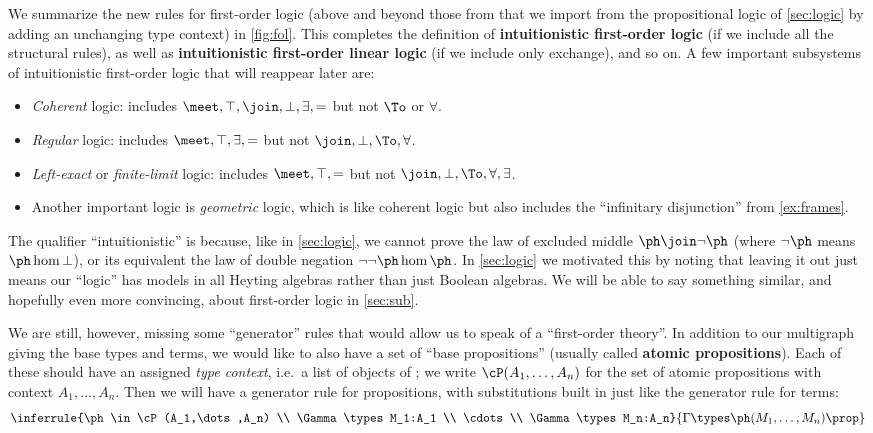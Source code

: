We summarize the new rules for first-order logic (above and beyond those from that we import from the propositional logic of \cref{sec:logic} by adding an unchanging type context) in \cref{fig:fol}.
This completes the definition of \textbf{intuitionistic first-order logic} (if we include all the structural rules), as well as \textbf{intuitionistic first-order linear logic} (if we include only exchange), and so on.
A few important subsystems of intuitionistic first-order logic that will reappear later are:
\begin{itemize}
\item \emph{Coherent} logic: includes $\meet,\top,\join,\bot,\exists,=$ but not $\To$ or $\forall$.
\item \emph{Regular} logic: includes $\meet,\top,\exists,=$ but not $\join,\bot,\To,\forall$.
\item \emph{Left-exact} or \emph{finite-limit} logic: includes $\meet,\top,=$ but not $\join,\bot,\To,\forall,\exists$.
\item Another important logic is \emph{geometric} logic, which is like coherent logic but also includes the ``infinitary disjunction'' from \cref{ex:frames}.
\end{itemize}
The qualifier ``intuitionistic'' is because, like in \cref{sec:logic}, we cannot prove the law of excluded middle $\ph\join\neg\ph$ (where $\neg\ph$ means $\ph\hom\bot$), or its equivalent the law of double negation $\neg\neg\ph\hom\ph$.
In \cref{sec:logic} we motivated this by noting that leaving it out just means our ``logic'' has models in all Heyting algebras rather than just Boolean algebras.
We will be able to say something similar, and hopefully even more convincing, about first-order logic in \cref{sec:sub}.

We are still, however, missing some ``generator'' rules that would allow us to speak of a ``first-order theory''.
In addition to our multigraph \cG giving the base types and terms, we would like to also have a set \cP of ``base propositions'' (usually called \textbf{atomic propositions}).
Each of these should have an assigned \emph{type context}, i.e.\ a list of objects of \cG; we write $\cP(A_1,\dots,A_n)$ for the set of atomic propositions with context $A_1,\dots,A_n$.
Then we will have a generator rule for propositions, with substitutions built in just like the generator rule for terms:
\[ \inferrule{\ph\in \cP(A_1,\dots,A_n) \\ \Gamma\types M_1:A_1 \\ \cdots\\ \Gamma\types M_n:A_n}{\Gamma \types \ph(M_1,\dots,M_n) \prop} \]

